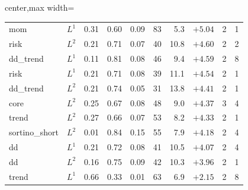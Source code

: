 \begin{table}[H]
\begin{adjustbox}{center,max width=\linewidth}
\begin{tabular}{llrrrrrrrr}
mom & $L^1$ & 0.31 & 0.60 & 0.09 & 83 & \phantom{0}5.3 & $+5.04$ & 2 & 1 \\
risk & $L^2$ & 0.21 & 0.71 & 0.07 & 40 & 10.8 & $+4.60$ & 2 & 2 \\
dd\_trend & $L^1$ & 0.11 & 0.81 & 0.08 & 46 & \phantom{0}9.4 & $+4.59$ & 2 & 8 \\
risk & $L^1$ & 0.21 & 0.71 & 0.08 & 39 & 11.1 & $+4.54$ & 2 & 1 \\
dd\_trend & $L^2$ & 0.21 & 0.74 & 0.05 & 31 & 13.8 & $+4.41$ & 2 & 1 \\
core & $L^2$ & 0.25 & 0.67 & 0.08 & 48 & \phantom{0}9.0 & $+4.37$ & 3 & 4 \\
trend & $L^2$ & 0.27 & 0.66 & 0.07 & 53 & \phantom{0}8.2 & $+4.33$ & 2 & 1 \\
sortino\_short & $L^2$ & 0.01 & 0.84 & 0.15 & 55 & \phantom{0}7.9 & $+4.18$ & 2 & 4 \\
dd & $L^1$ & 0.21 & 0.72 & 0.08 & 41 & 10.5 & $+4.07$ & 2 & 4 \\
dd & $L^2$ & 0.16 & 0.75 & 0.09 & 42 & 10.3 & $+3.96$ & 2 & 1 \\
trend & $L^1$ & 0.66 & 0.33 & 0.01 & 63 & \phantom{0}6.9 & $+2.15$ & 2 & 8 \\
\bottomrule
\end{tabular}
\end{adjustbox}
\end{table}

